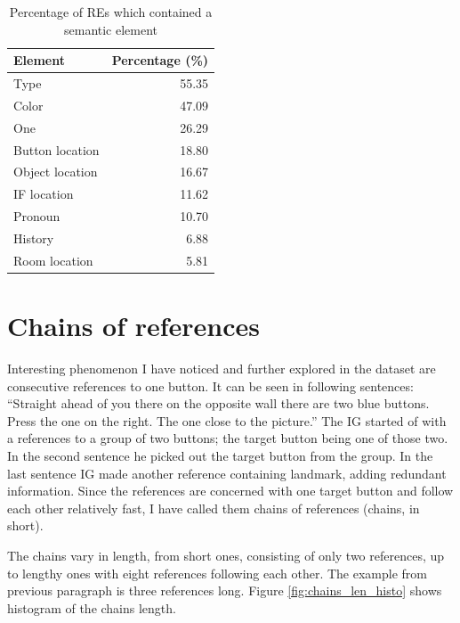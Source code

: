 \begin{table}[h!]
\centering
\begin{tabular}{lr}
\toprule
Element  & Percentage (\%)  \\
\midrule
Type   			& 55.35\\
Color			& 47.09\\
One 				& 26.29\\
Button location & 18.80\\
Object location 	& 16.67\\
IF location		& 11.62\\
Pronoun			& 10.70\\
History			& 6.88\\
Room location 	& 5.81\\
\bottomrule
\end{tabular}
\caption{Percentage of REs which contained a semantic element}
\label{tab:res-contents}
\end{table} 

\section{Chains of references}
Interesting phenomenon I have noticed and further explored in the dataset are consecutive references to one button. It can be seen in following sentences: ``Straight ahead of you there on the opposite wall there are two blue buttons. Press the one on the right. The one close to the picture.'' The IG started of with a references to a group of two buttons; the target button being one of those two. In the second sentence he picked out the target button from the group. In the last sentence IG made another reference containing landmark, adding redundant information. Since the references are concerned with one target button and follow each other relatively fast, I have called them chains of references (chains, in short).

The chains vary in length, from short ones, consisting of only two references, up to lengthy ones with eight references following each other. The example from previous paragraph is three references long. Figure \ref{fig:chains_len_histo} shows histogram of the chains length.

